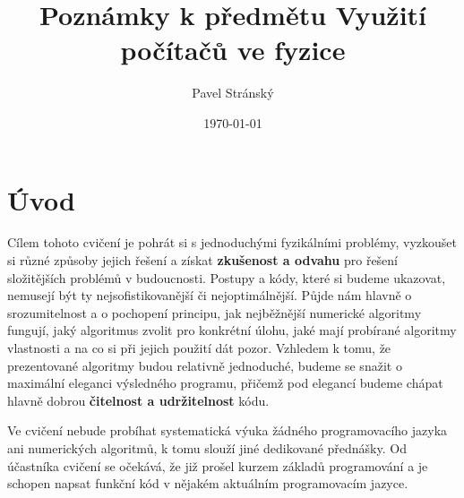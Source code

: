 \documentclass[a4paper,11pt,twoside]{article}
\theoremstyle{red}
\theoremstyle{green}
\begin{document}
\theoremstyle{spaced}
\newtheorem{example}{Příklad}[section]

\theoremstyle{blue}
\newtheorem{solution}{Řešení}[section]

\title{Poznámky k předmětu Využití počítačů ve fyzice}
\date{\today}
\author{Pavel Stránský}

\maketitle
\tableofcontents

\newcommand{\sectionbreak}{\clearpage}      %

\section{Úvod}
\label{sec:Uvod}
    Cílem tohoto cvičení je pohrát si s jednoduchými fyzikálními problémy, vyzkoušet si různé způsoby jejich řešení a získat {\bf zkušenost a odvahu} pro řešení složitějších problémů v budoucnosti.
    Postupy a kódy, které si budeme ukazovat, nemusejí být ty nejsofistikovanější či nejoptimálnější.
    Půjde nám hlavně o srozumitelnost a o pochopení principu, jak nejběžnější numerické algoritmy fungují, jaký algoritmus zvolit pro konkrétní úlohu, jaké mají probírané algoritmy vlastnosti a na co si při jejich použití dát pozor.
    Vzhledem k tomu, že prezentované algoritmy budou relativně jednoduché, budeme se snažit o maximální eleganci výsledného programu, přičemž pod elegancí budeme chápat hlavně dobrou {\bf čitelnost a udržitelnost} kódu.
    
    Ve cvičení nebude probíhat systematická výuka žádného programovacího jazyka ani numerických algoritmů, k tomu slouží jiné dedikované přednášky.
    Od účastníka cvičení se očekává, že již prošel kurzem základů programování a je schopen napsat funkční kód v nějakém aktuálním programovacím jazyce.
\end{document}
